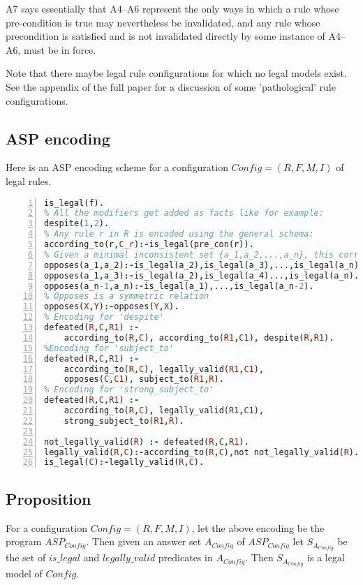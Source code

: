 A7 says essentially that A4--A6 represent the only ways in which a rule whose pre-condition is true may nevertheless be invalidated, and any rule whose precondition is satisfied and is not invalidated directly by some instance of A4--A6, must be in force. 

Note that there maybe legal rule configurations for which no legal models
exist. See the appendix of the full paper for a discussion of some
'pathological' rule configurations.

\subsection{ASP encoding}
Here is an ASP encoding scheme for a configuration $Config = (R,F,M,I)$ of legal rules.
\begin{lstlisting}[language=Prolog, numbers=left]
% For any f in F, we have:
is_legal(f). 
% All the modifiers get added as facts like for example:
despite(1,2).
% Any rule r in R is encoded using the general schema:
according_to(r,C_r):-is_legal(pre_con(r)).
% Given a minimal inconsistent set {a_1,a_2,...,a_n}, this corresponds to a set of rules:
opposes(a_1,a_2):-is_legal(a_2),is_legal(a_3),...,is_legal(a_n).
opposes(a_1,a_3):-is_legal(a_2),is_legal(a_4)...,is_legal(a_n).  % etc ...
opposes(a_n-1,a_n):-is_legal(a_1),...,is_legal(a_n-2).               
% Opposes is a symmetric relation
opposes(X,Y):-opposes(Y,X).
% Encoding for 'despite'
defeated(R,C,R1) :-
    according_to(R,C), according_to(R1,C1), despite(R,R1).
%Encoding for 'subject_to'
defeated(R,C,R1) :-
    according_to(R,C), legally_valid(R1,C1),
    opposes(C,C1), subject_to(R1,R).
% Encoding for 'strong_subject_to'
defeated(R,C,R1) :-
    according_to(R,C), legally_valid(R1,C1),
    strong_subject_to(R1,R).

not_legally_valid(R) :- defeated(R,C,R1).
legally_valid(R,C):-according_to(R,C),not not_legally_valid(R).
is_legal(C):-legally_valid(R,C).
\end{lstlisting}
\subsection{Proposition}

\begin{proposition}\label{lemma:legal_model_of_config}
For a configuration $Config=(R,F,M,I)$, let the above encoding be the program $ASP_{Config}$. Then given an answer set $A_{Config}$ of $ASP_{Config}$ let $S_{A_{Config}}$ be the set of $is\_legal$ and $legally\_valid$ predicates in $A_{Config}$. Then $S_{A_{Config}}$ is a legal model of $Config$. 
\end{proposition}


